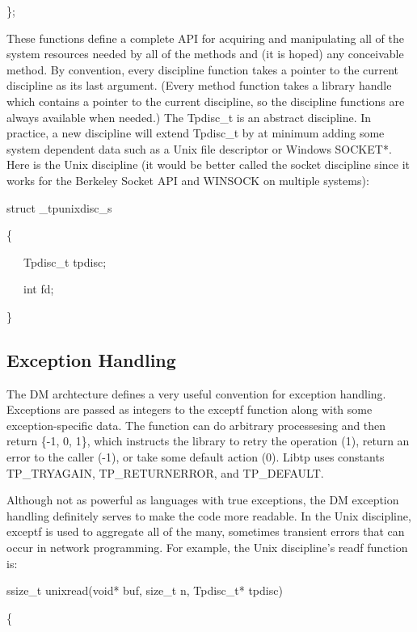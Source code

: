 {\ttfamily\mdseries
\};}


\bigskip


These functions define a complete API for acquiring and manipulating
all of the system resources needed by all of the methods and (it is
hoped) any conceivable method. By convention, every discipline
function takes a pointer to the current discipline as its last
argument. (Every method function takes a library handle which contains
a pointer to the current discipline, so the discipline functions are
always available when needed.) The Tpdisc\_t is an abstract
discipline. In practice, a new discipline will extend Tpdisc\_t by at
minimum adding some system dependent data such as a Unix file
descriptor or Windows SOCKET*. Here is the
{\textquotedbl}Unix{\textquotedbl} discipline (it would be better
called the socket discipline since it works for the Berkeley Socket
API and WINSOCK on multiple systems):

{\ttfamily\mdseries
struct \_tpunixdisc\_s}

{\ttfamily\mdseries
\{}

{\ttfamily\mdseries
\ \ \ Tpdisc\_t tpdisc;}

{\ttfamily\mdseries
\ \ \ int fd;}

{\ttfamily\mdseries
\}}

\subsection{Exception Handling}

The DM archtecture defines a very useful convention for exception
handling. Exceptions are passed as integers to the exceptf function
along with some exception-specific data. The function can do arbitrary
processesing and then return \{-1, 0, 1\}, which instructs the library
to retry the operation (1), return an error to the caller (-1), or
take some default action (0). Libtp uses constants TP\_TRYAGAIN,
TP\_RETURNERROR, and TP\_DEFAULT.

Although not as powerful as languages with true exceptions, the DM
exception handling definitely serves to make the code more
readable. In the Unix discipline, exceptf is used to aggregate all of
the many, sometimes transient errors that can occur in network
programming. For example, the Unix discipline's readf function is:

{\ttfamily\mdseries
ssize\_t unixread(void* buf, size\_t n, Tpdisc\_t* tpdisc)}

{\ttfamily\mdseries
\{}


